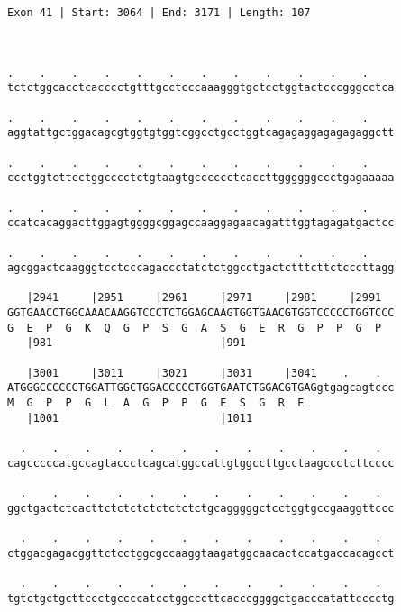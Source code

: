 \documentclass{article}
\begin{document}
\begin{Verbatim}
Exon 41 | Start: 3064 | End: 3171 | Length: 107



.    .    .    .    .    .    .    .    .    .    .    .    
tctctggcacctcacccctgtttgcctcccaaagggtgctcctggtactcccgggcctca
                                                            
.    .    .    .    .    .    .    .    .    .    .    .    
aggtattgctggacagcgtggtgtggtcggcctgcctggtcagagaggagagagaggctt
                                                            
.    .    .    .    .    .    .    .    .    .    .    .    
ccctggtcttcctggcccctctgtaagtgcccccctcaccttggggggccctgagaaaaa
                                                            
.    .    .    .    .    .    .    .    .    .    .    .    
ccatcacaggacttggagtggggcggagccaaggagaacagatttggtagagatgactcc
                                                            
.    .    .    .    .    .    .    .    .    .    .    .    
agcggactcaagggtcctcccagaccctatctctggcctgactctttcttctcccttagg
                                                            
   |2941     |2951     |2961     |2971     |2981     |2991  
GGTGAACCTGGCAAACAAGGTCCCTCTGGAGCAAGTGGTGAACGTGGTCCCCCTGGTCCC
G  E  P  G  K  Q  G  P  S  G  A  S  G  E  R  G  P  P  G  P  
   |981                          |991                       
  
   |3001     |3011     |3021     |3031     |3041    .    .  
ATGGGCCCCCCTGGATTGGCTGGACCCCCTGGTGAATCTGGACGTGAGgtgagcagtccc
M  G  P  P  G  L  A  G  P  P  G  E  S  G  R  E              
   |1001                         |1011                      
  
  .    .    .    .    .    .    .    .    .    .    .    .  
cagcccccatgccagtaccctcagcatggccattgtggccttgcctaagccctcttcccc
                                                            
  .    .    .    .    .    .    .    .    .    .    .    .  
ggctgactctcacttctctctctctctctctgcagggggctcctggtgccgaaggttccc
                                                            
  .    .    .    .    .    .    .    .    .    .    .    .  
ctggacgagacggttctcctggcgccaaggtaagatggcaacactccatgaccacagcct
                                                            
  .    .    .    .    .    .    .    .    .    .    .    .  
tgtctgctgcttccctgccccatcctggcccttcacccggggctgacccatattcccctg
                                                            

\end{Verbatim}
\end{document}
